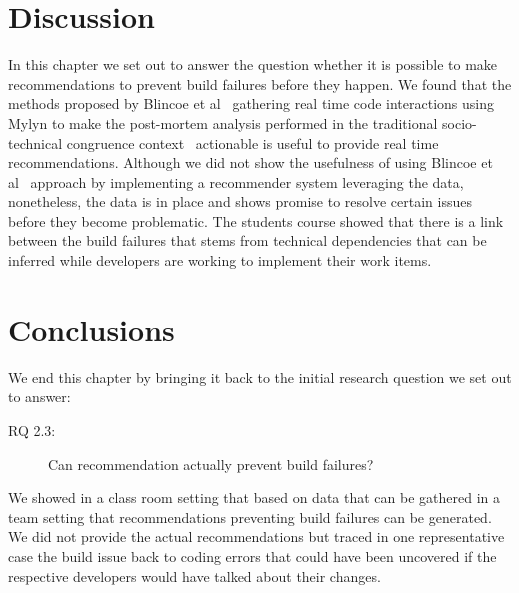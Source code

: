 \section{Discussion}
\label{ch10:dis}
In this chapter we set out to answer the question whether it is possible to make recommendations to prevent build failures before they happen.
We found that the methods proposed by Blincoe et al~\cite{blincoe:cscw:2012} gathering real time code interactions using Mylyn to make the post-mortem analysis performed in the traditional socio-technical congruence context~\cite{kersten:aosd:2005} actionable is useful to provide real time recommendations.
Although we did not show the usefulness of using Blincoe et al~\cite{blincoe:cscw:2012} approach by implementing a recommender system leveraging the data, nonetheless, the data is in place and shows promise to resolve certain issues before they become problematic.
The students course showed that there is a link between the build failures that stems from technical dependencies that can be inferred while developers are working to implement their work items.

\section{Conclusions}
\label{ch10:con}
We end this chapter by bringing it back to the initial research question we set out to answer:
\begin{description}
  \item[RQ 2.3:] Can recommendation actually prevent build failures?
\end{description}

We showed in a class room setting that based on data that can be gathered in a team setting that recommendations preventing build failures can be generated.
We did not provide the actual recommendations but traced in one representative case the build issue back to coding errors that could have been uncovered if the respective developers would have talked about their changes.